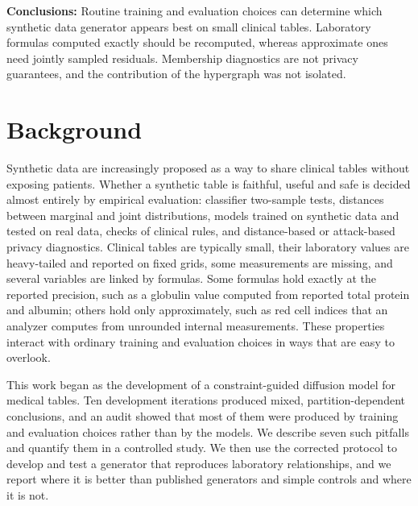 \documentclass[pdflatex,referee]{sn-jnl}%
\begin{document}
{\textbf{Conclusions:} Routine training and evaluation choices can determine which synthetic data generator appears best on small clinical tables. Laboratory formulas computed exactly should be recomputed, whereas approximate ones need jointly sampled residuals. Membership diagnostics are not privacy guarantees, and the contribution of the hypergraph was not isolated.}


\maketitle

\section*{Background}

Synthetic data are increasingly proposed as a way to share clinical tables without exposing patients. Whether a synthetic table is faithful, useful and safe is decided almost entirely by empirical evaluation: classifier two-sample tests, distances between marginal and joint distributions, models trained on synthetic data and tested on real data, checks of clinical rules, and distance-based or attack-based privacy diagnostics. Clinical tables are typically small, their laboratory values are heavy-tailed and reported on fixed grids, some measurements are missing, and several variables are linked by formulas. Some formulas hold exactly at the reported precision, such as a globulin value computed from reported total protein and albumin; others hold only approximately, such as red cell indices that an analyzer computes from unrounded internal measurements. These properties interact with ordinary training and evaluation choices in ways that are easy to overlook.

This work began as the development of a constraint-guided diffusion model for medical tables. Ten development iterations produced mixed, partition-dependent conclusions, and an audit showed that most of them were produced by training and evaluation choices rather than by the models. We describe seven such pitfalls and quantify them in a controlled study. We then use the corrected protocol to develop and test a generator that reproduces laboratory relationships, and we report where it is better than published generators and simple controls and where it is not.
\end{document}
